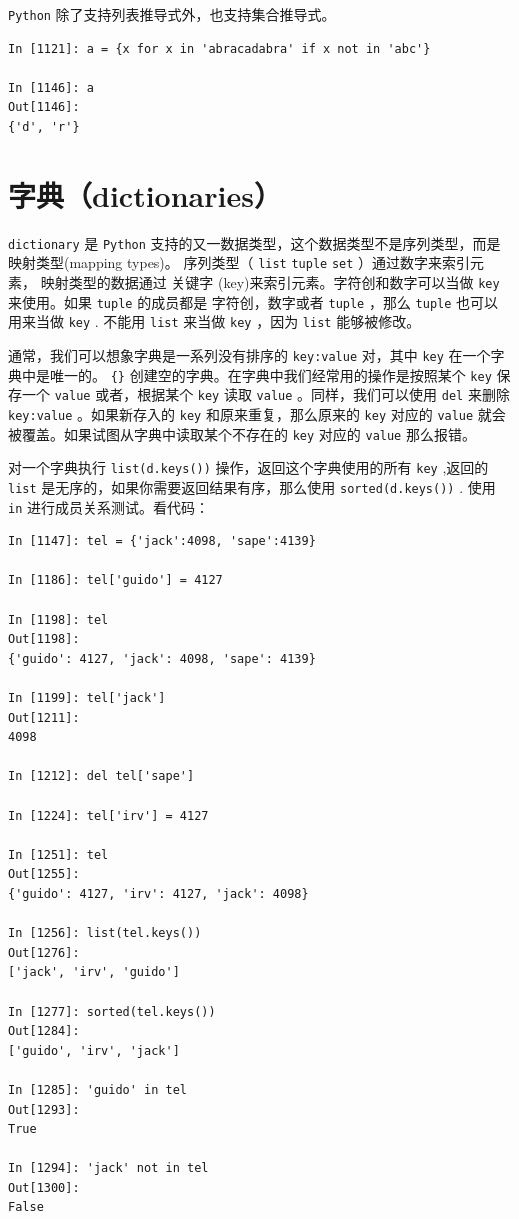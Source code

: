 \documentclass[10pt,a4paper,UTF8]{article}
\begin{document}
\texttt{Python} 除了支持列表推导式外，也支持集合推导式。
\begin{verbatim}
In [1121]: a = {x for x in 'abracadabra' if x not in 'abc'}

In [1146]: a
Out[1146]: 
{'d', 'r'}
\end{verbatim}

\section{字典（dictionaries）}
\label{sec:org5817950}


\texttt{dictionary} 是 \texttt{Python} 支持的又一数据类型，这个数据类型不是序列类型，而是映射类型(mapping types)。 序列类型（ \texttt{list} \texttt{tuple} \texttt{set} ）通过数字来索引元素， 映射类型的数据通过 关键字 (key)来索引元素。字符创和数字可以当做 \texttt{key} 来使用。如果 \texttt{tuple} 的成员都是 字符创，数字或者 \texttt{tuple} ，那么 \texttt{tuple} 也可以用来当做 \texttt{key} . 不能用 \texttt{list} 来当做 \texttt{key} ，因为 \texttt{list} 能够被修改。

通常，我们可以想象字典是一系列没有排序的 \texttt{key:value}  对，其中 \texttt{key} 在一个字典中是唯一的。 \texttt{\{\}} 创建空的字典。在字典中我们经常用的操作是按照某个 \texttt{key} 保存一个 \texttt{value} 或者，根据某个 \texttt{key} 读取 \texttt{value} 。同样，我们可以使用 \texttt{del} 来删除 \texttt{key:value} 。如果新存入的 \texttt{key} 和原来重复，那么原来的 \texttt{key} 对应的 \texttt{value} 就会被覆盖。如果试图从字典中读取某个不存在的 \texttt{key} 对应的 \texttt{value} 那么报错。

对一个字典执行 \texttt{list(d.keys())} 操作，返回这个字典使用的所有 \texttt{key} ,返回的 \texttt{list} 是无序的，如果你需要返回结果有序，那么使用 \texttt{sorted(d.keys())} . 使用 \texttt{in} 进行成员关系测试。看代码：
\begin{verbatim}
In [1147]: tel = {'jack':4098, 'sape':4139}

In [1186]: tel['guido'] = 4127

In [1198]: tel
Out[1198]: 
{'guido': 4127, 'jack': 4098, 'sape': 4139}

In [1199]: tel['jack']
Out[1211]: 
4098

In [1212]: del tel['sape']

In [1224]: tel['irv'] = 4127

In [1251]: tel
Out[1255]: 
{'guido': 4127, 'irv': 4127, 'jack': 4098}

In [1256]: list(tel.keys())
Out[1276]: 
['jack', 'irv', 'guido']

In [1277]: sorted(tel.keys())
Out[1284]: 
['guido', 'irv', 'jack']

In [1285]: 'guido' in tel
Out[1293]: 
True

In [1294]: 'jack' not in tel
Out[1300]: 
False
\end{verbatim}
\end{document}
